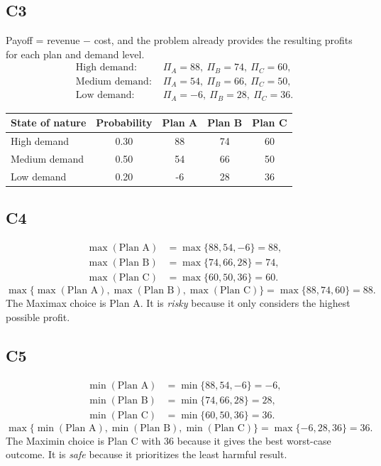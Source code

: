 \begin{ExamProblems}
		\subsection*{C3}
		Payoff = revenue $-$ cost, and the problem already provides the resulting profits for each plan and demand level.
		\[
		\begin{aligned}
		\text{High demand: } &\Pi_A=88,\ \Pi_B=74,\ \Pi_C=60,\\
		\text{Medium demand: } &\Pi_A=54,\ \Pi_B=66,\ \Pi_C=50,\\
		\text{Low demand: } &\Pi_A=-6,\ \Pi_B=28,\ \Pi_C=36.
		\end{aligned}
		\]
		\begin{center}
			\begin{tabular}{l c c c c}
				\toprule
				State of nature & Probability & Plan A & Plan B & Plan C \\
				\midrule
				High demand & 0.30 & 88 & 74 & 60 \\
				Medium demand & 0.50 & 54 & 66 & 50 \\
				Low demand & 0.20 & -6 & 28 & 36 \\
				\bottomrule
			\end{tabular}
		\end{center}

		\subsection*{C4}
		\[
		\begin{aligned}
		\max(\text{Plan A}) &= \max\{88,54,-6\} = 88,\\
		\max(\text{Plan B}) &= \max\{74,66,28\} = 74,\\
		\max(\text{Plan C}) &= \max\{60,50,36\} = 60.
		\end{aligned}
		\]
		\[
		\max\{\max(\text{Plan A}), \max(\text{Plan B}), \max(\text{Plan C})\}
		= \max\{88, 74, 60\}
		= 88.
		\]
		The Maximax choice is Plan A. It is \emph{risky} because it only considers the highest possible profit.

		\subsection*{C5}
		\[
		\begin{aligned}
		\min(\text{Plan A}) &= \min\{88,54,-6\} = -6,\\
		\min(\text{Plan B}) &= \min\{74,66,28\} = 28,\\
		\min(\text{Plan C}) &= \min\{60,50,36\} = 36.
		\end{aligned}
		\]
		\[
		\max\{\min(\text{Plan A}), \min(\text{Plan B}), \min(\text{Plan C})\}
		= \max\{-6, 28, 36\}
		= 36.
		\]
		The Maximin choice is Plan C with 36 because it gives the best worst-case outcome. It is \emph{safe} because it prioritizes the least harmful result.


\end{ExamProblems}
